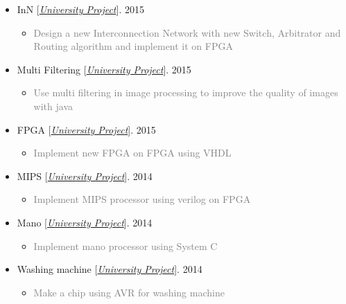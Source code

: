 \documentclass[10pt,a4paper,sans]{moderncv} %
\begin{document}
\begin{itemize}
		\item InN [\href{https://sbu.ac.ir/Cols/CSE/Pages/default.aspx/}{\emph{University Project}}]. \hfill 2015
		\begin{itemize}
			\item \textcolor{gray} {Design a new Interconnection Network with new Switch, Arbitrator and Routing algorithm and implement it on FPGA}
		\end{itemize}

		\item Multi Filtering [\href{https://sbu.ac.ir/Cols/CSE/Pages/default.aspx/}{\emph{University Project}}]. \hfill 2015
		\begin{itemize}
			\item \textcolor{gray} {Use multi filtering in image processing to improve the quality of images with java}
		\end{itemize}

		\item FPGA [\href{https://sbu.ac.ir/Cols/CSE/Pages/default.aspx/}{\emph{University Project}}]. \hfill 2015
		\begin{itemize}
			\item \textcolor{gray} {Implement new FPGA on FPGA using VHDL}
		\end{itemize}

		\item MIPS [\href{https://sbu.ac.ir/Cols/CSE/Pages/default.aspx/}{\emph{University Project}}]. \hfill 2014
		\begin{itemize}
			\item \textcolor{gray} {Implement MIPS processor using verilog on FPGA}
		\end{itemize}

		\item Mano [\href{https://sbu.ac.ir/Cols/CSE/Pages/default.aspx/}{\emph{University Project}}]. \hfill 2014
		\begin{itemize}
			\item \textcolor{gray} {Implement mano processor using System C}
		\end{itemize}

		\item Washing machine [\href{https://sbu.ac.ir/Cols/CSE/Pages/default.aspx/}{\emph{University Project}}]. \hfill 2014
		\begin{itemize}
			\item \textcolor{gray} {Make a chip using AVR for washing machine}
		\end{itemize}


\end{itemize}
\end{document}
